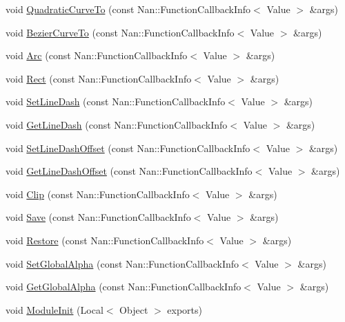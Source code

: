 \begin{DoxyCompactItemize}
\item 
void \hyperlink{namespaceinfoscreen_a24430b724e295b278359545896f91fda}{Quadratic\+Curve\+To} (const Nan\+::\+Function\+Callback\+Info$<$ Value $>$ \&args)
\item 
void \hyperlink{namespaceinfoscreen_aa7a693002661da7f0cc71405d4f92509}{Bezier\+Curve\+To} (const Nan\+::\+Function\+Callback\+Info$<$ Value $>$ \&args)
\item 
void \hyperlink{namespaceinfoscreen_a8a899a7ec3b4243119348b0ff3260c55}{Arc} (const Nan\+::\+Function\+Callback\+Info$<$ Value $>$ \&args)
\item 
void \hyperlink{namespaceinfoscreen_aacd06a703186ee5aa0cf711a6a25e780}{Rect} (const Nan\+::\+Function\+Callback\+Info$<$ Value $>$ \&args)
\item 
void \hyperlink{namespaceinfoscreen_a62f1c932238f7fa66085cf346494f065}{Set\+Line\+Dash} (const Nan\+::\+Function\+Callback\+Info$<$ Value $>$ \&args)
\item 
void \hyperlink{namespaceinfoscreen_a323629a38a813bbf8bb5d973abf871d2}{Get\+Line\+Dash} (const Nan\+::\+Function\+Callback\+Info$<$ Value $>$ \&args)
\item 
void \hyperlink{namespaceinfoscreen_af25862d384d78c0893ed33161ebedce4}{Set\+Line\+Dash\+Offset} (const Nan\+::\+Function\+Callback\+Info$<$ Value $>$ \&args)
\item 
void \hyperlink{namespaceinfoscreen_aad84590855cdb610319659cf410e5810}{Get\+Line\+Dash\+Offset} (const Nan\+::\+Function\+Callback\+Info$<$ Value $>$ \&args)
\item 
void \hyperlink{namespaceinfoscreen_a764c69d0f8065ad061538096a034de22}{Clip} (const Nan\+::\+Function\+Callback\+Info$<$ Value $>$ \&args)
\item 
void \hyperlink{namespaceinfoscreen_ada6a7a462dfd8045a4fb28587be03fd6}{Save} (const Nan\+::\+Function\+Callback\+Info$<$ Value $>$ \&args)
\item 
void \hyperlink{namespaceinfoscreen_a2f977a37c1604a678015c76df25bd7a3}{Restore} (const Nan\+::\+Function\+Callback\+Info$<$ Value $>$ \&args)
\item 
void \hyperlink{namespaceinfoscreen_a4ac22724f14bdf5c2222c8b26fad3aa5}{Set\+Global\+Alpha} (const Nan\+::\+Function\+Callback\+Info$<$ Value $>$ \&args)
\item 
void \hyperlink{namespaceinfoscreen_a1713ea9f97e207b0ee48d2e05129c8c7}{Get\+Global\+Alpha} (const Nan\+::\+Function\+Callback\+Info$<$ Value $>$ \&args)
\item 
void \hyperlink{namespaceinfoscreen_a65cbf50a99fb4020aceffb62d9627d73}{Module\+Init} (Local$<$ Object $>$ exports)
\end{DoxyCompactItemize}


